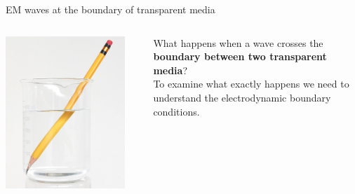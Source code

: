 \begin{frame}{EM waves at the boundary of transparent media}

\begin{columns}
  \begin{column}{0.50\textwidth}
    \begin{center}
      \includegraphics[width=0.90\textwidth]{./images/photos/pencil_in_glass_of_water.jpg}\\
    \end{center}
  \end{column}
  \begin{column}{0.50\textwidth}
      What happens when a wave crosses the {\bf boundary between two transparent media}?\\
      \vspace{0.5cm}
      To examine what exactly happens we need to understand the
      electrodynamic boundary conditions.
  \end{column}
\end{columns}

\end{frame}

%
%
%

